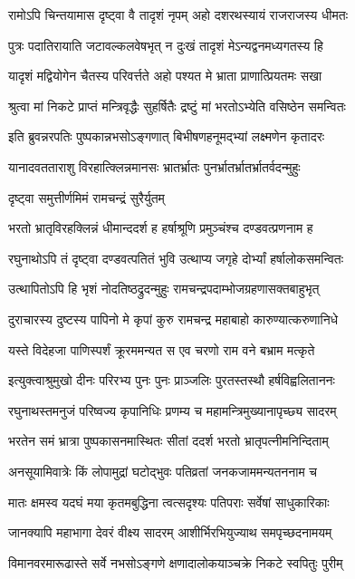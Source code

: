 \twolineshloka
{रामोऽपि चिन्तयामास दृष्ट्वा वै तादृशं नृपम्}
{अहो दशरथस्यायं राजराजस्य धीमतः}%

\twolineshloka
{पुत्रः पदातिरायाति जटावल्कलवेषभृत्}
{न दुःखं तादृशं मेऽन्यद्वनमध्यगतस्य हि}%

\twolineshloka
{यादृशं मद्वियोगेन चैतस्य परिवर्त्तते}
{अहो पश्यत मे भ्राता प्राणात्प्रियतमः सखा}%

\twolineshloka
{श्रुत्वा मां निकटे प्राप्तं मन्त्रिवृद्धैः सुहर्षितैः}
{द्रष्टुं मां भरतोऽभ्येति वसिष्ठेन समन्वितः}%

\twolineshloka
{इति ब्रुवन्नरपतिः पुष्पकान्नभसोऽङ्गणात्}
{बिभीषणहनूमद्भ्यां लक्ष्मणेन कृतादरः}%

\twolineshloka
{यानादवतताराशु विरहात्क्लिन्नमानसः}
{भ्रातर्भ्रातः पुनर्भ्रातर्भ्रातर्भ्रातर्वदन्मुहुः}%

दृष्ट्वा समुत्तीर्णमिमं रामचन्द्रं सुरैर्युतम्

\twolineshloka
{भरतो भ्रातृविरहक्लिन्नं धीमान्ददर्श ह}
{हर्षाश्रूणि प्रमुञ्चंश्च दण्डवत्प्रणनाम ह}%

\twolineshloka
{रघुनाथोऽपि तं दृष्ट्वा दण्डवत्पतितं भुवि}
{उत्थाप्य जगृहे दोर्भ्यां हर्षालोकसमन्वितः}%

\twolineshloka
{उत्थापितोऽपि हि भृशं नोदतिष्ठद्रुदन्मुहुः}
{रामचन्द्रपदाम्भोजग्रहणासक्तबाहुभृत्}%


\twolineshloka
{दुराचारस्य दुष्टस्य पापिनो मे कृपां कुरु}
{रामचन्द्र महाबाहो कारुण्यात्करुणानिधे}%

\twolineshloka
{यस्ते विदेहजा पाणिस्पर्शं क्रूरममन्यत}
{स एव चरणो राम वने बभ्राम मत्कृते}%

\twolineshloka
{इत्युक्त्वाश्रुमुखो दीनः परिरभ्य पुनः पुनः}
{प्राञ्जलिः पुरतस्तस्थौ हर्षविह्वलिताननः}%

\twolineshloka
{रघुनाथस्तमनुजं परिष्वज्य कृपानिधिः}
{प्रणम्य च महामन्त्रिमुख्यानापृच्छ्य सादरम्}%

\twolineshloka
{भरतेन समं भ्रात्रा पुष्पकासनमास्थितः}
{सीतां ददर्श भरतो भ्रातृपत्नीमनिन्दिताम्}%

\twolineshloka
{अनसूयामिवात्रेः किं लोपामुद्रां घटोद्भुवः}
{पतिव्रतां जनकजाममन्यतननाम च}%

\twolineshloka
{मातः क्षमस्व यदघं मया कृतमबुद्धिना}
{त्वत्सदृश्यः पतिपराः सर्वेषां साधुकारिकाः}%

\twolineshloka
{जानक्यापि महाभागा देवरं वीक्ष्य सादरम्}
{आशीर्भिरभियुज्याथ समपृच्छदनामयम्}%

\twolineshloka
{विमानवरमारूढास्ते सर्वे नभसोऽङ्गणे}
{क्षणादालोकयाञ्चक्रे निकटे स्वपितुः पुरीम्}%

